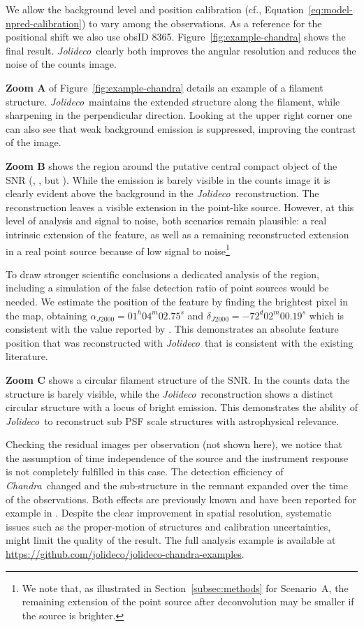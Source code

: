 \documentclass[twocolumn, lineno]{aastex631}
\newcommand{\chandra}{\textit{Chandra}~}
\newcommand{\jolideco}{\textit{Jolideco}~}
\begin{document}
    We allow the background level and position calibration (cf., Equation~\ref{eq:model-npred-calibration}) to vary among the observations. As a reference for the positional shift we also use obsID 8365. Figure~\ref{fig:example-chandra} shows the final result. \jolideco clearly both improves the angular resolution and reduces the noise of the counts image. 
    
    \textbf{Zoom A} of Figure~\ref{fig:example-chandra} details an example of a filament structure. \jolideco maintains the extended structure along the filament, while sharpening in the perpendicular direction. Looking at the upper right corner one can also see that weak background emission is suppressed, improving the contrast of the image.
    
    \textbf{Zoom B} shows the region around the putative central compact object of the SNR (\cite{Vogt2018}, \cite{Hebbar2020}, but \cite{Long2020}). While the emission is barely visible in the counts image it is clearly evident above the background in the \jolideco reconstruction. The reconstruction leaves a visible extension in the point-like source. However, at this level of analysis and signal to noise, both scenarios remain plausible: a real intrinsic extension of the feature, as well as a remaining reconstructed extension in a real point source because of low signal to noise\footnote{We note that, as illustrated in Section~\ref{subsec:methods} for Scenario~A, the remaining extension of the point source after deconvolution may be smaller if the source is brighter.} 
    
    To draw stronger scientific conclusions a dedicated analysis of the region, including a simulation of the false detection ratio of point sources would be needed. We estimate the position of the feature by finding the brightest pixel in the map, obtaining $\alpha_{J2000}=01^h04^m02.75^s$ and $\delta_{J2000}=-72^d02^m00.19^s$ which is consistent with the value reported by \cite{Long2020}. This demonstrates an absolute feature position that was reconstructed with \jolideco that is consistent with the existing literature.
    
    \textbf{Zoom C} shows a circular filament structure of the SNR. In the counts data the structure is barely visible, while the \jolideco reconstruction shows a distinct circular structure with a locus of bright emission. This demonstrates the ability of \jolideco to reconstruct sub PSF scale structures with astrophysical relevance.

    Checking the residual images per observation (not shown here), we notice that the assumption of time independence of the source and the instrument response is not completely fulfilled in this case. The detection efficiency of \chandra changed and the sub-structure in the remnant expanded over the time of the observations. Both effects are previously known and have been reported for example in \cite{Xi2019}. Despite the clear improvement in spatial resolution, systematic issues such as the proper-motion of structures and calibration uncertainties, might limit the quality of the result. The full analysis example is available at \url{https://github.com/jolideco/jolideco-chandra-examples}.
\end{document}
